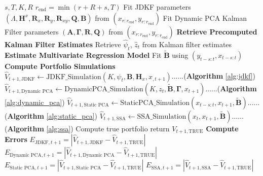 \documentclass[11pt]{article}
\theoremstyle{plain}
\theoremstyle{definition}
\theoremstyle{remark}
\numberwithin{equation}{section}
\begin{document}
\begin{algorithm}[H]
\caption{Historical Rolling Back-Test SSA vs JDKF with Periodic Re-Fitting} \label{alg:historical_backtest}
\begin{algorithmic}[1]
\Require $s, T, K, R$
\newline
{} 
\newline
{} 
\newline
{}
\newline
{}
\newline
{}
\newline
{}
    \State $r_{\text{end}} = \min(r + R + s, T)$
    \State Fit JDKF parameters $(\Lambda, \mathbf{H}^x, \mathbf{R}_x, \mathbf{R}_y, \mathbf{R}_{xy}, \mathbf{Q}, \mathbf{B})$ from $(x_{r:r_{\text{end}}}, y_{r:r_{\text{end}}})$
    \State Fit Dynamic PCA Kalman Filter parameters $(\mathbf{A}, \mathbf{\Gamma}, \mathbf{R}, \mathbf{Q})$ from $(x_{r:r_{\text{end}}}, y_{r:r_{\text{end}}})$
        \State \textbf{Retrieve Precomputed Kalman Filter Estimates}
        \State Retrieve $\hat{\psi}_t$, $\hat{z}_t$ from Kalman filter estimates
        \State \textbf{Estimate Multivariate Regression Model}
        \State Fit $\mathbf{\tilde{B}}$ using $(y_{t-s:t}, x_{t-s:t})$
        \State \textbf{Compute Portfolio Simulations}
        \State $\hat{V}_{t+1, \mathrm{JDKF}} \gets \text{JDKF\_Simulation}(K, \psi_t, \mathbf{B}, \mathbf{H}_x, x_{,t+1})$......(\textbf{Algorithm} \ref{alg:jdkf})
        \State $\hat{V}_{t+1, \text{Dynamic PCA}} \gets \text{DynamicPCA\_Simulation}(K, z_t, \mathbf{\tilde{B}}, \mathbf{\Gamma}, x_{t+1})$......(\textbf{Algorithm} \ref{alg:dynamic_pca})
        \State $\hat{V}_{t+1, \text{Static PCA}} \gets \text{StaticPCA\_Simulation}(x_{t-s:t}, x_{t+1}, \mathbf{\tilde{B}})$......(\textbf{Algorithm} \ref{alg:static_pca})
        \State $\hat{V}_{t+1, \mathrm{SSA}} \gets \text{SSA\_Simulation}(x_t, x_{t+1}, \mathbf{\tilde{B}})$......(\textbf{Algorithm} \ref{alg:ssa})
        \State Compute true portfolio return $V_{t+1,\mathrm{TRUE}}$
        \State \textbf{Compute Errors}
        \State $E_{\mathrm{JDKF},t+1} = |\hat{V}_{t+1, \mathrm{JDKF}} - \hat{V}_{t+1, \mathrm{TRUE}}|$
        \State $E_{\text{Dynamic PCA},t+1} = |\hat{V}_{t+1, \text{Dynamic PCA}} - \hat{V}_{t+1, \mathrm{TRUE}}|$
        \State $E_{\text{Static PCA},t+1} = |\hat{V}_{t+1, \text{Static PCA}} - \hat{V}_{t+1, \mathrm{TRUE}}|$
        \State $E_{\mathrm{SSA},t+1} = |\hat{V}_{t+1, \mathrm{SSA}} - \hat{V}_{t+1, \mathrm{TRUE}}|$
    \EndFor
\EndFor
\end{algorithmic}
\end{algorithm}
\end{document}
